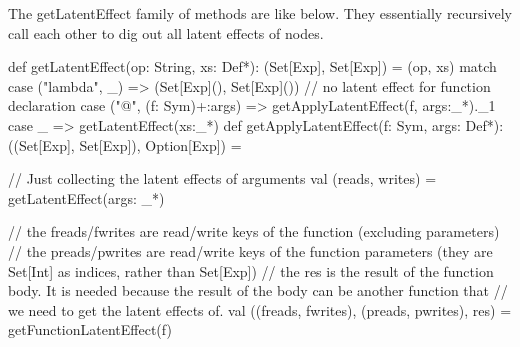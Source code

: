 The getLatentEffect family of methods are like below. They essentially recursively
call each other to dig out all latent effects of nodes.

\begin{listing}[scala]
def getLatentEffect(op: String, xs: Def*): (Set[Exp], Set[Exp]) = (op, xs) match {
    case ("lambda", _) => (Set[Exp](), Set[Exp]()) // no latent effect for function declaration
    case ("@", (f: Sym)+:args) => getApplyLatentEffect(f, args:_*)._1
    case _ => getLatentEffect(xs:_*)
}
def getApplyLatentEffect(f: Sym, args: Def*): ((Set[Exp], Set[Exp]), Option[Exp]) = {
    // Just collecting the latent effects of arguments
    val (reads, writes) = getLatentEffect(args: _*)

    // the freads/fwrites are read/write keys of the function (excluding parameters)
    // the preads/pwrites are read/write keys of the function parameters (they are Set[Int] as indices, rather than Set[Exp])
    // the res is the result of the function body. It is needed because the result of the body can be another function that
    //     we need to get the latent effects of.
    val ((freads, fwrites), (preads, pwrites), res) = getFunctionLatentEffect(f)

}
\end{listing}
